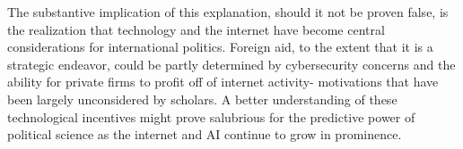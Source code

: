 \documentclass{article}
\begin{document}
The substantive implication of this explanation, should it not be proven false, is the realization that technology and the internet have become central considerations for international politics. Foreign aid, to the extent that it is a strategic endeavor, could be partly determined by cybersecurity concerns and the ability for private firms to profit off of internet activity- motivations that have been largely unconsidered by scholars. A better understanding of these technological incentives might prove salubrious for the predictive power of political science as the internet and AI continue to grow in prominence.
\printbibliography
\end{document}
